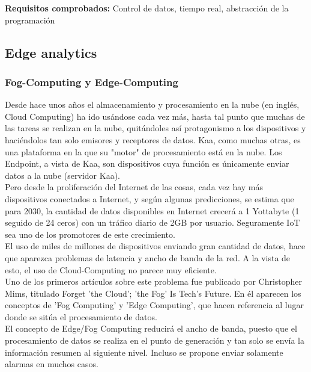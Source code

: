 \documentclass[12pt, twoside]{book}
\begin{document}
\textbf{Requisitos comprobados: } Control de datos, tiempo real, abstracción de la programación




\subsection{Edge analytics}
\subsubsection*{Fog-Computing y Edge-Computing}
Desde hace unos años el almacenamiento y procesamiento en la nube (en inglés, Cloud Computing) ha ido usándose cada vez más, hasta tal punto que muchas de las tareas se realizan en la nube, quitándoles así protagonismo a los dispositivos y haciéndolos tan solo emisores y receptores de datos. Kaa, como muchas otras, es una plataforma en la que su "motor" de procesamiento está en la nube. Los Endpoint, a vista de Kaa, son dispositivos cuya función es únicamente enviar datos a la nube (servidor Kaa). \\
Pero desde la proliferación del Internet de las cosas, cada vez hay más dispositivos conectados a Internet, y según algunas predicciones, se estima que para 2030, la cantidad de datos disponibles en Internet crecerá a 1 Yottabyte (1 seguido de 24 ceros) con un tráfico diario de 2GB por usuario. Seguramente IoT sea uno de los promotores de este crecimiento. \\
El uso de miles de millones de dispositivos enviando gran cantidad de datos, hace que aparezca problemas de latencia y ancho de banda de la red. A la vista de esto, el uso de Cloud-Computing no parece muy eficiente.\\ %
Uno de los primeros artículos sobre este problema fue publicado por Christopher Mims, titulado Forget 'the Cloud'; 'the Fog' Is Tech's Future\cite{wsj}. En él aparecen los conceptos de 'Fog Computing' y 'Edge Computing', que hacen referencia al lugar donde se sitúa el procesamiento de datos.\\
El concepto de Edge/Fog Computing reducirá el ancho de banda, puesto que el procesamiento de datos se realiza en el punto de generación y tan solo se envía la información resumen al siguiente nivel. Incluso se propone enviar solamente alarmas en muchos casos. 
\end{document}
